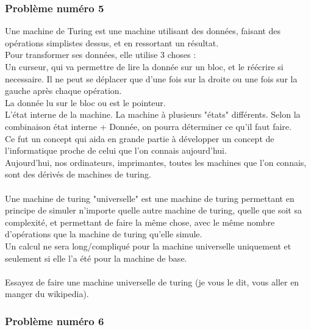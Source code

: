 \documentclass[12pt]{article}
\begin{document}
\subsubsection{Problème numéro 5}

Une machine de Turing est une machine utilisant des données, faisant des opérations simplistes dessus, et en ressortant un résultat.\\
Pour transformer ses données, elle utilise 3 choses :\\
Un curseur, qui va permettre de lire la donnée sur un bloc, et le réécrire si necessaire. Il ne peut se déplacer que d'une fois sur la droite ou une fois sur la gauche après chaque opération.\\
La donnée lu sur le bloc ou est le pointeur.\\
L'état interne de la machine. La machine à plusieurs "états" différents. Selon la combinaison état interne + Donnée, on pourra déterminer ce qu'il faut faire.\\
Ce fut un concept qui aida en grande partie à développer un concept de l'informatique proche de celui que l'on connais aujourd'hui.\\
Aujourd'hui, nos ordinateurs, imprimantes, toutes les machines que l'on connais, sont des dérivés de machines de turing.
\\\\
Une machine de turing "universelle" est une machine de turing permettant en principe de simuler n'importe quelle autre machine de turing, quelle que soit sa complexité, et permettant de faire la même chose, avec le même nombre d'opérations que la machine de turing qu'elle simule.\\
Un calcul ne sera long/compliqué pour la machine universelle uniquement et seulement si elle l'a été pour la machine de base.
\\\\
Essayez de faire une machine universelle de turing (je vous le dit, vous aller en manger du wikipedia).

\subsubsection{Problème numéro 6}
\end{document}
